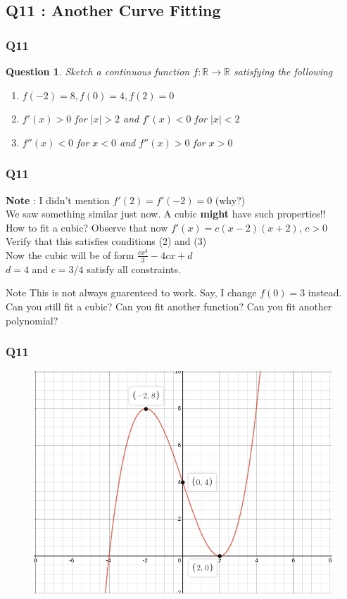 \documentclass[handout,aspectratio=169]{beamer}
\newtheorem{qsn}{Question}
\newcommand{\bR}{\mathbb{R}}
\begin{document}
\subsection{Q11 : Another Curve Fitting}

\begin{frame}
\frametitle{Q11}
\pause
\begin{qsn}
Sketch a continuous function $f:\bR\to\bR$ satisfying the following \\ \pause
\begin{enumerate}
\item $f(-2)=8, f(0)=4, f(2)=0$ \pause
\item $f'(x)>0$ for $|x|>2$ and $f'(x)<0$ for $|x|<2$ \pause
\item $f''(x)<0$ for $x<0$ and $f''(x)>0$ for $x>0$ 
\end{enumerate}
\end{qsn}
\end{frame}

\begin{frame}
\frametitle{Q11}
\textbf{Note} : I didn't mention $f'(2)=f'(-2)=0$ (why?) \\[1mm] \pause
We saw something similar just now. A cubic \textbf{might} have such properties!! \\[1mm] \pause
How to fit a cubic? Observe that now $f'(x) = c(x-2)(x+2)$, $c>0$ \\[1mm] \pause
Verify that this satisfies conditions (2) and (3) \\[1mm] \pause
Now the cubic will be of form $\frac{cx^3}{3}-4cx+d$ \\[1mm] \pause
$d=4$ and $c=3/4$ satisfy all constraints. \\[2mm] \pause
\begin{block}{Note}
This is not always guarenteed to work. Say, I change $f(0)=3$ instead. Can you still fit a cubic? Can you fit another function? Can you fit another polynomial?
\end{block}
\end{frame}

\begin{frame}
\pause
\frametitle{Q11}
\begin{figure}[H]
\includegraphics[scale=0.3]{plot2.jpg}
\end{figure}
\end{frame}
\end{document}
